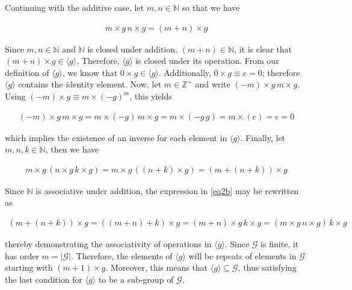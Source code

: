 \documentclass{article}[12]
\numberwithin{equation}{section}
\newcommand{\N}{\mathbb{N}}
\newcommand{\Z}{\mathbb{Z}}
\begin{document}
\begin{flushleft}
Continuing with the additive case, let $m, n \in \N$ so that we have

\begin{align*}
  m \times g \, n \times g = \left( m + n \right) \times g
\end{align*}

Since $m, n \in \N$ and $\N$ is closed under addition, $\left( m + n \right) \in \N$, it is clear that $\left(m + n\right) \times g \in \langle g \rangle$.  Therefore, $\langle g \rangle$ is closed under its operation.  From our definition of $\langle g \rangle$, we know that $0 \times g \in \langle g \rangle$.  Additionally, $0 \times g \equiv e = 0$; therefore $\langle g \rangle$ contains the identity element.  Now, let $m \in \Z^+$ and write $\left(-m\right) \times g \, m \times g$.  Using $\left(-m\right) \times g \equiv m \times \left( - g \right)^m$, this yields

\begin{align*}
  \left(-m\right) \times g \, m \times g = m \times \left( -g \right) \, m \times g = m \times \left( -g \, g \right) = m \times \left( e \right) = e = 0
\end{align*}

which implies the existence of an inverse for each element in $\langle g \rangle$.  Finally, let $m, n, k \in \N$, then we have

\begin{align}
  m \times g \, \left( n \times g \, k \times g \right) = m \times g \, \left( \left(n+k\right) \times g \right) = \left(m + \left( n + k \right)\right) \times g \label{eq2b}
\end{align}

Since $\N$ is associative under addition, the expression in \ref{eq2b} may be rewritten as

\begin{align*}
  \left(m + \left( n + k \right)\right) \times g = \left( \left(m+n\right) + k \right) \times g = \left(m+n\right) \times g \, k \times g = \left( m \times g \, n \times g \right) \, k \times g
\end{align*}

thereby demonstrating the associativity of operations in $\langle g \rangle$.  Since $\mathcal{G}$ is finite, it has order $m = \lvert \mathcal{G} \rvert$.  Therefore, the elements of $\langle g \rangle$ will be repeats of elements in $\mathcal{G}$ starting with $\left(m+1\right) \times g$.  Moreover, this means that $\langle g \rangle \subseteq \mathcal{G}$, thus satisfying the last condition for $\langle g \rangle$ to be a sub-group of $\mathcal{G}$.




\end{flushleft}
\end{document}
